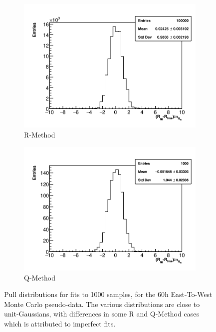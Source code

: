 \begin{figure}[]
    \begin{subfigure}[t]{0.45\textwidth}
        \centering
        \includegraphics[width=\textwidth]{Rpull_RMethod}
        \caption{R-Method}
    \end{subfigure}
    \hspace{1mm}
    \begin{subfigure}[t]{0.45\textwidth}
        \centering
        \includegraphics[width=\textwidth]{Rpull_QMethod}
        \caption{Q-Method}
    \end{subfigure}
\caption[]{Pull distributions for fits to 1000 samples, for the 60h East-To-West Monte Carlo pseudo-data. The various distributions are close to unit-Gaussians, with differences in some R and Q-Method cases which is attributed to imperfect fits.}
\label{fig:pulls}
\end{figure}





